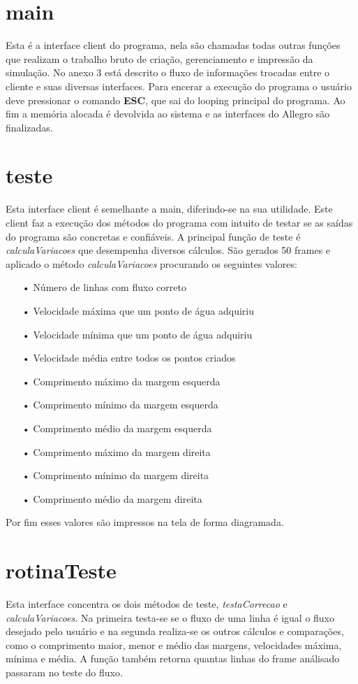 \documentclass[a4paper,11pt]{article}
\begin{document}
\section{main}
Esta é a interface client do programa, nela são chamadas todas outras fun\c{c}ões que realizam o trabalho bruto de cria\c{c}ão, gerenciamento e impressão da simula\c{c}ão. No anexo 3 está descrito o fluxo de informa\c{c}ões trocadas entre o cliente e suas diversas interfaces. Para encerar a execu\c{c}ão do programa o usuário deve pressionar o comando \textbf{ESC}, que sai do looping principal do programa. Ao fim a memória alocada é devolvida ao sistema e as interfaces do Allegro são finalizadas.

\section{teste}
Esta interface client é semelhante a main, diferindo-se na sua utilidade. Este client faz a execu\c{c}ão dos métodos do programa com intuito de testar se as saídas do programa são concretas e confiáveis. A principal fun\c{c}ão de teste é \textit{calculaVariacoes} que desempenha diversos cálculos. São gerados 50 frames e aplicado o método \textit{calculaVariacoes} procurando os seguintes valores:
\begin{enumerate}
\item[•]{Número de linhas com fluxo correto}
\item[•]{Velocidade máxima que um ponto de água adquiriu}
\item[•]{Velocidade mínima que um ponto de água adquiriu}
\item[•]{Velocidade média entre todos os pontos criados}
\item[•]{Comprimento máximo da margem esquerda}
\item[•]{Comprimento mínimo da margem esquerda}
\item[•]{Comprimento médio da margem esquerda}
\item[•]{Comprimento máximo da margem direita}
\item[•]{Comprimento mínimo da margem direita}
\item[•]{Comprimento médio da margem direita}
\end{enumerate}
Por fim esses valores são impressos na tela de forma diagramada.

\section{rotinaTeste}
Esta interface concentra os dois métodos de teste, \textit{testaCorrecao} e \textit{calculaVariacoes}. Na primeira testa-se se o fluxo de uma linha é igual o fluxo desejado pelo usuário e na segunda realiza-se os outros cálculos e compara\c{c}ões, como o comprimento maior, menor e médio das margens, velocidades máxima, mínima e média. A fun\c{c}ão também retorna quantas linhas do frame análisado passaram no teste do fluxo.
\end{document}
